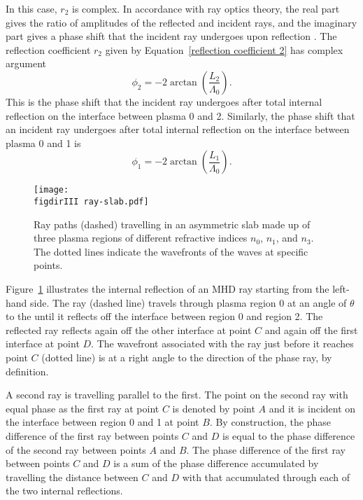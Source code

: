 	In this case, $r_2$ is complex. In accordance with ray optics theory, the real part gives the ratio of amplitudes of the reflected and incident rays, and the imaginary part gives a phase shift that the incident ray undergoes upon reflection \citep{bor_etal99}. The reflection coefficient $r_2$ given by Equation~\eqref{reflection coefficient 2} has complex argument
	\begin{equation}
	\phi_2 = -2 \arctan\left(\frac{L_2}{\Lambda_0}\right).
	\end{equation}
	This is the phase shift that the incident ray undergoes after total internal reflection on the interface between plasma 0 and 2. Similarly, the phase shift that an incident ray undergoes after total internal reflection on the interface between plasma 0 and 1 is
	\begin{equation}
	\phi_1 = -2 \arctan\left(\frac{L_1}{\Lambda_0}\right).
	\end{equation}
	
	\begin{figure}
		\centering
		\texttt{[image: \\figdirIII ray-slab.pdf]}
		\caption{Ray paths (dashed) travelling in an asymmetric slab made up of three plasma regions of different refractive indices $n_0$, $n_1$, and $n_3$. The dotted lines indicate the wavefronts of the waves at specific points.}
		\label{fig: ray slab}
	\end{figure}
	Figure~\ref{fig: ray slab} illustrates the internal reflection of an MHD ray starting from the left-hand side. The ray (dashed line) travels through plasma region 0 at an angle of $\theta$ to the until it reflects off the interface between region 0 and region 2. The reflected ray reflects again off the other interface at point $C$ and again off the first interface at point $D$. The wavefront associated with the ray just before it reaches point $C$ (dotted line) is at a right angle to the direction of the phase ray, by definition.
	
	A second ray is travelling parallel to the first. The point on the second ray with equal phase as the first ray at point $C$ is denoted by point $A$ and it is incident on the interface between region 0 and 1 at point $B$. By construction, the phase difference of the first ray between points $C$ and $D$ is equal to the phase difference of the second ray between points $A$ and $B$. The phase difference of the first ray between points $C$ and $D$ is a sum of the phase difference accumulated by travelling the distance between $C$ and $D$ with that accumulated through each of the two internal reflections.
	
